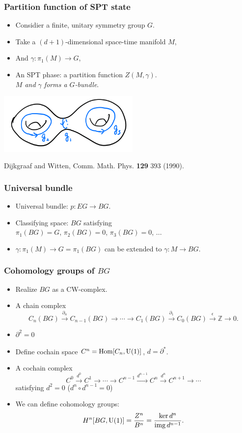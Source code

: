 \documentclass[xcolor=table, aspectratio=43,ignorenonframetext]{beamer}
\DeclareMathOperator{\img}{img}
\DeclareMathOperator{\hhom}{Hom}
\begin{document}
\begin{frame}
	\frametitle{Partition function of SPT state}
	\begin{itemize}
		\item Considier a finite, unitary symmetry group $G$.
		\item Take a $(d+1)$-dimensional space-time manifold $M$,
		\item And $\gamma:\pi_1(M)\rightarrow G$,
		\item An SPT phase: a partition function $Z(M,\gamma)$.\\
		\emph{$M$ and $\gamma$ forms a $G$-bundle}.
	\end{itemize}
	\begin{center}
		\includegraphics[height=3cm]{../spt-lecture/manifold}
	\end{center}
	{\small Dijkgraaf and Witten, Comm. Math. Phys. \textbf{129} 393 (1990).}
\end{frame}

\begin{frame}
	\frametitle{Universal bundle}
	\begin{itemize}
		\item Universal bundle: $p: EG \rightarrow BG$.
		\item Classifying space: $BG$ satisfying\\
		$\pi_1(BG) = G$, $\pi_2(BG)=0$, $\pi_3(BG)=0$, ...
		\item $\gamma:\pi_1(M)\rightarrow G=\pi_1(BG)$ can be extended to $\gamma:M\rightarrow BG$.
	\end{itemize}
\end{frame}

\begin{frame}
	\frametitle{Cohomology groups of $BG$}
	\begin{itemize}
		\item Realize $BG$ as a CW-complex.
		\item A chain complex
		\[C_n(BG)\xrightarrow{\partial_n}
		C_{n-1}(BG)\rightarrow\cdots\rightarrow
		C_1(BG)\xrightarrow{\partial_1}
		C_0(BG)\xrightarrow{\epsilon}\mathbb Z\rightarrow0.\]
		\item $\partial^2=0$
		\item Define cochain space $C^n=\hhom[C_n,\text U(1)]$, $d = \partial^\ast$.
		\item A cochain complex
		\[C^0\xrightarrow{d^0}C^1\rightarrow\cdots\rightarrow C^{n-1}\xrightarrow{d^{n-1}}C^n\xrightarrow{d^n}C^{n+1}\rightarrow\cdots\]
		satisfying $d^2=0$ ($d^n\circ d^{n-1}=0$)
		\item We can define cohomology groups:
		\[H^n[BG,\text U(1)] = \frac{Z^n}{B^n} = \frac{\ker d^n}{\img d^{n-1}}.\]
	\end{itemize}
\end{frame}
\end{document}
